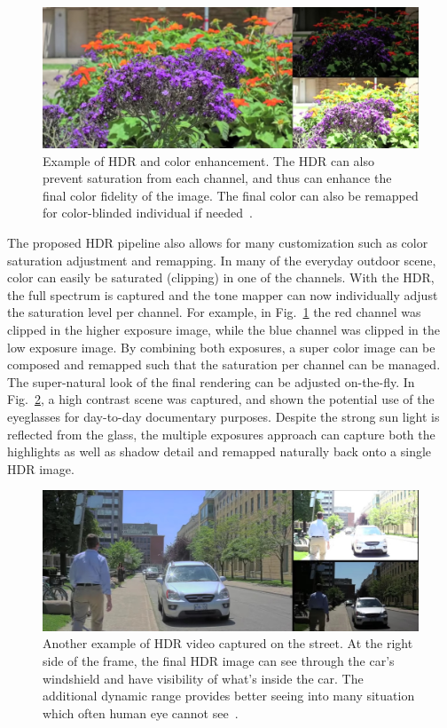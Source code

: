 \begin{figure}
\center
 \includegraphics[width=5.5in]{ch2/diagrams/everyday1.jpg}
 \caption{Example of HDR and color enhancement. The HDR can also prevent saturation from each 
channel, and thus can enhance the final color fidelity of the image. The final color can also be 
remapped for color-blinded individual if needed~\cite{mann2012hdrchitecture}.}
 \label{fig:extremeeveryday1}
\end{figure}

The proposed HDR pipeline also allows for many customization such as color saturation adjustment 
and remapping. In many of the everyday outdoor scene, color can easily be saturated (clipping) in 
one of the channels. With the HDR, the full spectrum is captured and the tone mapper can now 
individually adjust the saturation level per channel. For example, in Fig.~\ref{fig:extremeeveryday1} 
the red channel was clipped in the higher exposure image, while the blue channel was clipped in the 
low exposure image. By combining both exposures, a super color image can be composed and 
remapped such that the saturation per channel can be managed. The super-natural look of the final 
rendering can be adjusted on-the-fly. In Fig.~\ref{fig:extremeeveryday2}, a high contrast scene was 
captured, and shown the potential use of the eyeglasses for day-to-day documentary purposes. 
Despite the strong sun light is reflected from the glass, the multiple exposures approach can capture 
both the highlights as well as shadow detail and remapped naturally back onto a single HDR image.

\begin{figure}
\center
 \includegraphics[width=5.5in]{ch2/diagrams/everyday2.jpg}
 \caption{Another example of HDR video captured on the street. At the right side of the frame, the 
final HDR image can see through the car's windshield and have visibility of what's inside the car. The 
additional dynamic range provides better seeing into many situation which often human eye cannot 
see~\cite{mann2012hdrchitecture}.}
 \label{fig:extremeeveryday2}
\end{figure}

